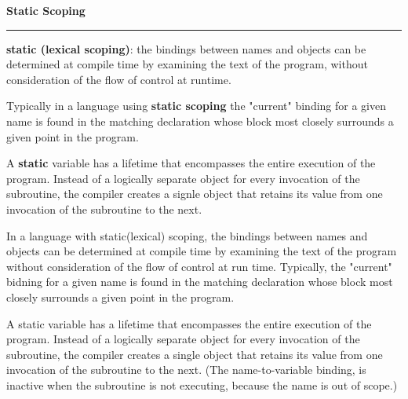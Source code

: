 \nopagenumbers
{\bf Static Scoping}
\vskip 1mm
\hrule

\vskip 6pt
{\bf static (lexical scoping)}: the bindings between names and objects can be determined at compile time by examining the text of the program, without consideration of the flow of control at runtime.

\vskip 6pt
Typically in a language using {\bf static scoping} the "current" binding for a given name is found in the matching declaration whose block most closely surrounds a given point in the program.

\vskip 6pt
A {\bf static} variable has a lifetime that encompasses the entire execution of the program. Instead of a logically separate object for every invocation of the subroutine, the compiler creates a signle object that retains its value from one invocation of the subroutine to the next.

\vskip 6pt
In a language with static(lexical) scoping, the bindings between names and objects can be determined at compile time by examining the text of the program without consideration of the flow of control at run time. Typically, the "current" bidning for a given name is found in the matching declaration whose block most closely surrounds a given point in the program.

\vskip 6pt
A static variable has a lifetime that encompasses the entire execution of the program. Instead of a logically separate object for every invocation of the subroutine, the compiler creates a single object that retains its value from one invocation of the subroutine to the next. (The name-to-variable binding, is inactive when the subroutine is not executing, because the name is out of scope.)




\vfill\eject
\bye
